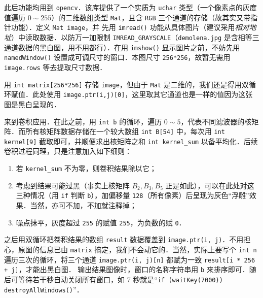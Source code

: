 \documentclass[12pt,a4paper,twoside]{ctexart}
\numberwithin{figure}{section}
\numberwithin{equation}{section}
\begin{document}
此后功能均用到 \verb|opencv|．该库提供了一个实质为 \verb|uchar| 类型（一个像素点的灰度值遍历 $0\sim 255$）的二维数组类型 \verb|Mat|，且含 \verb|RGB| 三个通道的存储（故其实又带指针功能）．定义 \verb|Mat image|，并
先用 \verb|imread()| 功能从具体图片（建议采用\textit{相对地址}）中读取数据．以防万一加限制 \verb|IMREAD_GRAYSCALE|（\verb|demolena.jpg| 是含相等三通道数据的黑白图，用不用都行）．在用 \verb|imshow()| 显示图片之前，不妨先用 \verb|namedWindow()| 设置成可调尺寸的窗口．本图尺寸 \verb|256*256|，故暂无需用 \verb|image.rows| 等去提取尺寸数据．

用 \verb|int matrix[256*256]| 存储 \verb|image|，但由于 \verb|Mat| 是二维的，我们还是得用双循环赋值．此处使用 \verb|image.ptr(i,j)[0]|，这里取其它通道也是一样的值因为这张图是黑白呈现的．

来到卷积应用．在此之前，用 \verb|int b| 的循环，遍历 $0\sim 5$，代表不同滤波器的核矩阵．而所有核矩阵数据存储在一个较大数组 \verb|int B[54]| 中，每次用 \verb|int kernel[9]| 截取即可，并顺便求出核矩阵之和 \verb|int kernel_sum| 以备平均化．后续卷积过程同理，只是注意加入如下细则：
\begin{enumerate}
    \item 若 \verb|kernel_sum| 不为零，则卷积结果除以它；
    \item 考虑到结果可能过黑（事实上核矩阵 $B_2,B_3,B_5$ 正是如此），可以在此处对这三种情况（用 \verb|if| 判断 \verb|b|），加偏移量 \verb|128|（所有像素）后呈现为灰色“浮雕”效果．当然，亦可不加，不加就注释掉；
    \item 噪点抹平，灰度超过 \verb|255| 的赋值 \verb|255|，为负数的赋 \verb|0|．
\end{enumerate}
之后用双循环把卷积结果的数组 \verb|result| 数据覆盖到 \verb|image.ptr(i, j)|．不用担心，原图的信息已由 \verb|matrix| 搞定，我们不会动它的．当然，实际上要写个 \verb|int n| 遍历三次的循环，将三个通道 \verb|image.ptr(i, j)[n]| 都赋为一致 \verb|result[i * 256 + j]|，才能出黑白图．
输出结果图像时，窗口的名称字符串用 \verb|b| 来排序即可．随后可等待若干秒自动关闭所有窗口，如 7 秒就是“\verb|if (waitKey(7000)) destroyAllWindows()|”．
\end{document}
